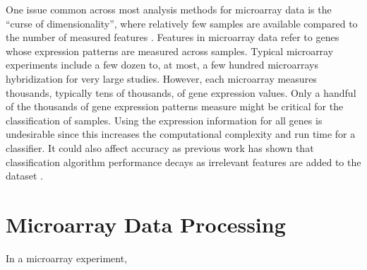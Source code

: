 {%

One issue common across most analysis methods for microarray data is the
``curse of dimensionality'', where relatively few samples are available
compared to the number of measured features \cite{Bellman_1957}.
Features in microarray data refer to genes whose expression patterns are
measured across samples.  Typical microarray experiments include a few dozen
to, at most, a few hundred microarrays hybridization for very large studies.
However, each microarray measures thousands, typically tens of thousands, of
gene expression values.  Only a handful of the thousands of gene expression
patterns measure might be critical for the classification of samples.  Using
the expression information for all genes is undesirable since this increases
the computational complexity and run time for a classifier.  It could also
affect accuracy as previous work has shown that classification algorithm
performance decays as irrelevant features are added to the dataset
\cite{john94irrelevant}. 






\section{Microarray Data Processing}

In a microarray experiment, 

}
